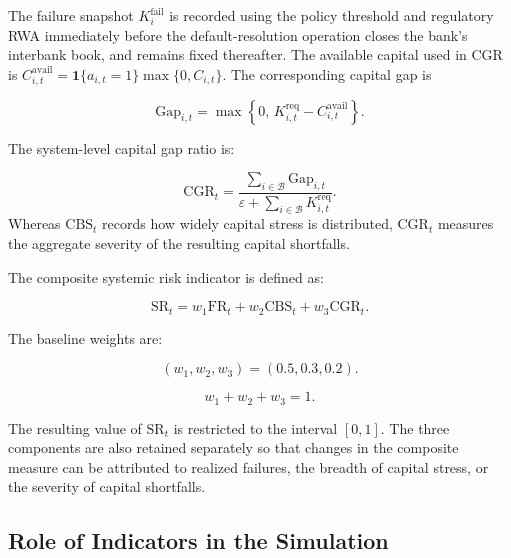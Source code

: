 The failure snapshot \(K_i^{\mathrm{fail}}\) is recorded using the
 policy threshold and regulatory RWA immediately before the default-resolution
 operation closes the bank's interbank book, and remains fixed thereafter.
 The available capital used in CGR is
 \(C_{i,t}^{\mathrm{avail}}=\mathbf{1}\{a_{i,t}=1\}\max\{0,C_{i,t}\}\).
 The corresponding capital gap is


\begin{equation}
\mathrm{Gap}_{i,t}=\max\left\{0,\,K_{i,t}^{\mathrm{req}}-C_{i,t}^{\mathrm{avail}}\right\}\label{eq:capital-gap}.
\end{equation}


The system-level capital gap ratio is:


\begin{equation}
\mathrm{CGR}_t=\frac{\displaystyle\sum_{i\in\mathcal B}\mathrm{Gap}_{i,t}}{\varepsilon+\displaystyle\sum_{i\in\mathcal B}K_{i,t}^{\mathrm{req}}}\label{eq:capital-gap-ratio}.
\end{equation}
\vspace{-0.4\baselineskip}
\noindent Whereas
\(\mathrm{CBS}_t\) records how widely capital stress is distributed,
\(\mathrm{CGR}_t\) measures the aggregate severity of the resulting capital
shortfalls.

The composite systemic risk indicator is defined as:


\begin{equation}
\mathrm{SR}_t=w_1\mathrm{FR}_t+w_2\mathrm{CBS}_t+w_3\mathrm{CGR}_t\label{eq:systemic-risk}.
\end{equation}


The baseline weights are:


\begin{equation}
\left(w_1,w_2,w_3\right)=\left(0.5,0.3,0.2\right).
\end{equation}



\begin{equation}
w_1+w_2+w_3=1.
\end{equation}


The resulting value of \(\mathrm{SR}_t\) is restricted to the interval
\(\left\lbrack 0,1 \right\rbrack\). The three components are also
retained separately so that changes in the composite measure can be
attributed to realized failures, the breadth of capital stress, or the
severity of capital shortfalls.

\subsection{Role of Indicators in the Simulation}


